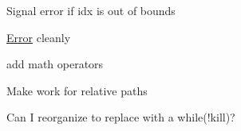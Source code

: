 \begin{DoxyRefList}
Signal error if idx is out of bounds  
\item[\label{todo__todo000023}%
\Hypertarget{todo__todo000023}%
Member \hyperlink{classnta_1_1utils_1_1Json_a905d67b125a7aadd771bb74a1bb63f34}{nta\+:\+:utils\+:\+:Json\+:\+:tokenize} (std\+::string curr)]\hyperlink{structnta_1_1Error}{Error} cleanly  
\item[\label{todo__todo000005}%
\Hypertarget{todo__todo000005}%
Class \hyperlink{classnta_1_1utils_1_1JsonNum}{nta\+:\+:utils\+:\+:Json\+Num} ]add math operators 
\item[\label{todo__todo000025}%
\Hypertarget{todo__todo000025}%
Member \hyperlink{classnta_1_1utils_1_1Path_aa124dc05466b3f681d02579fa0022a6a}{nta\+:\+:utils\+:\+:Path\+:\+:parent} () const]Make work for relative paths  
\item[\label{todo__todo000029}%
\Hypertarget{todo__todo000029}%
Member \hyperlink{classnta_1_1utils_1_1ThreadPool_a2ca98ba5ed4510e5aac90c0507859b8d}{nta\+:\+:utils\+:\+:Thread\+Pool\+:\+:dispatcher} ()]Can I reorganize to replace with a while(!kill)? 
\end{DoxyRefList}